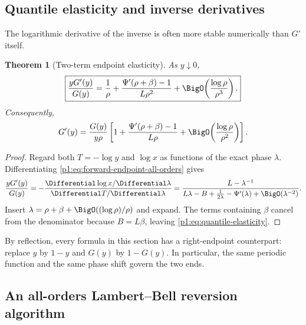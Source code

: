 \documentclass[11pt,oneside]{article}
\numberwithin{equation}{section}
\newtheorem{theorem}{Theorem}[section]
\theoremstyle{definition}
\theoremstyle{remark}
\begin{document}
\subsection{Quantile elasticity and inverse derivatives}

The logarithmic derivative of the inverse is often more stable numerically than $G'$ itself.

\begin{theorem}[Two-term endpoint elasticity]
\label{p1:thm:quantile-elasticity}
As $y\downarrow0$,
\begin{equation}
 \boxed{
 \frac{yG'(y)}{G(y)}
 =\frac1\rho+\frac{\Psi'(\rho+\beta)-1}{L\rho^2}
 +\BigO\!\left(\frac{\log\rho}{\rho^3}\right).}
 \label{p1:eq:quantile-elasticity}
\end{equation}
Consequently,
\begin{equation}
 G'(y)=\frac{G(y)}{y\rho}
 \left[1+\frac{\Psi'(\rho+\beta)-1}{L\rho}
 +\BigO\!\left(\frac{\log\rho}{\rho^2}\right)\right].
 \label{p1:eq:Gprime-endpoint}
\end{equation}
\end{theorem}

\begin{proof}
Regard both $T=-\log y$ and $\log x$ as functions of the exact phase $\lambda$.
Differentiating \eqref{p1:eq:forward-endpoint-all-orders} gives
\begin{equation}
 \frac{yG'(y)}{G(y)}
 =-\frac{\Differential\log x/\Differential\lambda}{\Differential T/\Differential\lambda}
 =\frac{L-\lambda^{-1}}
 {L\lambda-B+\tfrac1{2\lambda}-\Psi'(\lambda)+\BigO(\lambda^{-2})}.
 \label{p1:eq:elasticity-exact-ratio}
\end{equation}
Insert $\lambda=\rho+\beta+\BigO((\log\rho)/\rho)$ and expand.  The terms
containing $\beta$ cancel from the denominator because $B=L\beta$, leaving
\eqref{p1:eq:quantile-elasticity}.
\end{proof}

By reflection, every formula in this section has a right-endpoint counterpart: replace
$y$ by $1-y$ and $G(y)$ by $1-G(y)$.  In particular, the same periodic function and
the same phase shift govern the two ends.

\subsection{An all-orders Lambert--Bell reversion algorithm}
\end{document}
